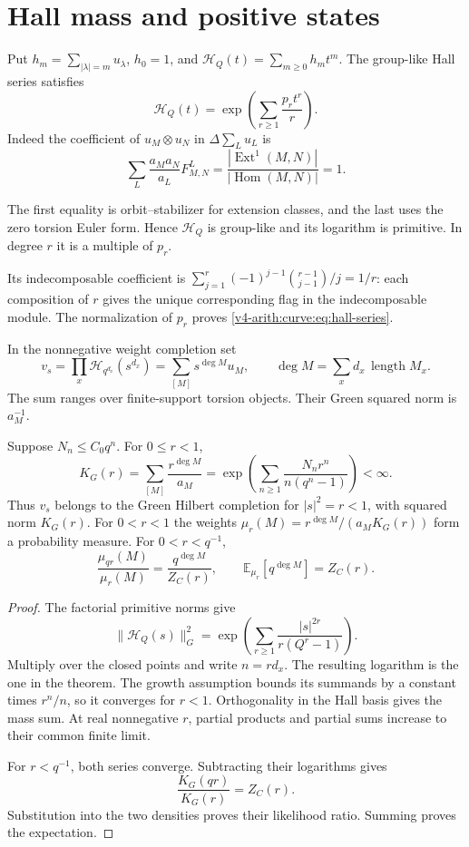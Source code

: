 \section{Hall mass and positive states}
\label{v4-arith:curve:sec:states}

Put $h_m=\sum_{|\lambda|=m}u_\lambda$, $h_0=1$, and
$\mathcal H_Q(t)=\sum_{m\geq0}h_mt^m$.
The group-like Hall series satisfies
\begin{equation}\label{v4-arith:curve:eq:hall-series}
 \mathcal H_Q(t)=\exp\left(\sum_{r\geq1}\frac{p_rt^r}{r}\right).
\end{equation}
Indeed the coefficient of $u_M\otimes u_N$ in
$\Delta\sum_Lu_L$ is
\[
 \sum_L\frac{a_Ma_N}{a_L}F^L_{M,N}
 =\frac{|\operatorname{Ext}^1(M,N)|}{|\operatorname{Hom}(M,N)|}
 =1.
\]

The first equality is orbit--stabilizer for extension classes,
and the last uses the zero torsion Euler form.
Hence $\mathcal H_Q$ is group-like and its logarithm is
primitive. In degree $r$ it is a multiple of $p_r$.

Its indecomposable coefficient is
$\sum_{j=1}^r(-1)^{j-1}\binom{r-1}{j-1}/j=1/r$:
each composition of $r$ gives the unique corresponding flag
in the indecomposable module. The normalization of $p_r$
proves \eqref{v4-arith:curve:eq:hall-series}.

In the nonnegative weight completion set
\[
 v_s=\prod_x\mathcal H_{q^{d_x}}(s^{d_x})
     =\sum_{[M]}s^{\deg M}u_M,
 \qquad \deg M=\sum_xd_x\,\operatorname{length}M_x.
\]
The sum ranges over finite-support torsion objects.
Their Green squared norm is $a_M^{-1}$.

\begin{theorem}\label{v4-arith:curve:thm:mass}
Suppose $N_n\leq C_0q^n$. For $0\leq r<1$,
\[
 K_G(r)=\sum_{[M]}\frac{r^{\deg M}}{a_M}
       =\exp\left(\sum_{n\geq1}\frac{N_nr^n}{n(q^n-1)}\right)
       <\infty .
\]
Thus $v_s$ belongs to the Green Hilbert completion for
$|s|^2=r<1$, with squared norm $K_G(r)$.
For $0<r<1$ the weights
$\mu_r(M)=r^{\deg M}/(a_MK_G(r))$ form a probability measure.
For $0<r<q^{-1}$,
\begin{equation}\label{v4-arith:curve:eq:likelihood}
 \frac{\mu_{qr}(M)}{\mu_r(M)}
   =\frac{q^{\deg M}}{Z_C(r)},\qquad
 \mathbb E_{\mu_r}[q^{\deg M}]=Z_C(r).
\end{equation}
\end{theorem}
\begin{proof}
The factorial primitive norms give
\[
 \|\mathcal H_Q(s)\|_G^2
 =\exp\left(\sum_{r\geq1}\frac{|s|^{2r}}{r(Q^r-1)}\right).
\]
Multiply over the closed points and write $n=rd_x$.
The resulting logarithm is the one in the theorem.
The growth assumption bounds its summands by a constant
times $r^n/n$, so it converges for $r<1$.
Orthogonality in the Hall basis gives the mass sum.
At real nonnegative $r$, partial products and partial sums
increase to their common finite limit.

For $r<q^{-1}$, both series converge. Subtracting their
logarithms gives
\[
 \frac{K_G(qr)}{K_G(r)}=Z_C(r).
\]
Substitution into the two densities proves their likelihood ratio.
Summing proves the expectation.
\end{proof}

